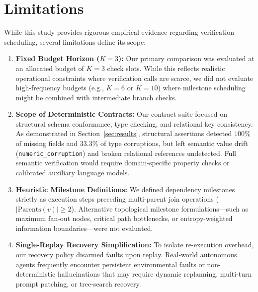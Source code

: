 \section{Limitations}
\label{sec:limitations}

While this study provides rigorous empirical evidence regarding verification scheduling, several limitations define its scope:

\begin{enumerate}
    \item \textbf{Fixed Budget Horizon ($K=3$):} Our primary comparison was evaluated at an allocated budget of $K = 3$ check slots. While this reflects realistic operational constraints where verification calls are scarce, we did not evaluate high-frequency budgets (e.g., $K = 6$ or $K = 10$) where milestone scheduling might be combined with intermediate branch checks.
    \item \textbf{Scope of Deterministic Contracts:} Our contract suite focused on structural schema conformance, type checking, and relational key consistency. As demonstrated in Section~\ref{sec:results}, structural assertions detected $100\%$ of missing fields and $33.3\%$ of type corruptions, but left semantic value drift (\texttt{numeric\_corruption}) and broken relational references undetected. Full semantic verification would require domain-specific property checks or calibrated auxiliary language models.
    \item \textbf{Heuristic Milestone Definitions:} We defined dependency milestones strictly as execution steps preceding multi-parent join operations ($|\text{Parents}(v)| \ge 2$). Alternative topological milestone formulations—such as maximum fan-out nodes, critical path bottlenecks, or entropy-weighted information boundaries—were not evaluated.
    \item \textbf{Single-Replay Recovery Simplification:} To isolate re-execution overhead, our recovery policy disarmed faults upon replay. Real-world autonomous agents frequently encounter persistent environmental faults or non-deterministic hallucinations that may require dynamic replanning, multi-turn prompt patching, or tree-search recovery.
\end{enumerate}
